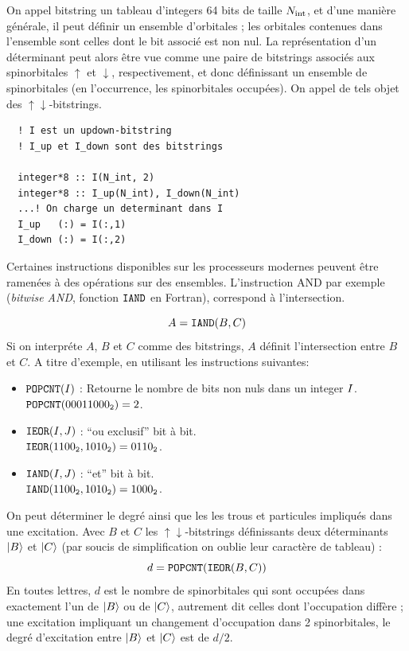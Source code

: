 \documentclass[./thesis.tex]{subfiles}
\begin{document}
On appel bitstring un tableau d'integers 64 bits de taille ${N_\text{int}}$, et d'une manière générale, il peut définir un ensemble d'orbitales ; les orbitales contenues dans l'ensemble sont celles dont le bit associé est non nul. La représentation d'un déterminant peut alors être vue comme une paire de bitstrings associés aux spinorbitales $\uparrow$ et $\downarrow$, respectivement, et donc définissant un ensemble de spinorbitales (en l’occurrence, les spinorbitales occupées). On appel de tels objet des $\uparrow\downarrow$-bitstrings.
\lstset{frame=single}
\begin{lstlisting}
  ! I est un updown-bitstring
  ! I_up et I_down sont des bitstrings
  
  integer*8 :: I(N_int, 2)
  integer*8 :: I_up(N_int), I_down(N_int)
  ...! On charge un determinant dans I
  I_up   (:) = I(:,1)
  I_down (:) = I(:,2)
\end{lstlisting}
\lstset{frame=none}

Certaines instructions disponibles sur les processeurs modernes peuvent être ramenées à des opérations sur des ensembles. L'instruction AND par exemple (\emph{bitwise AND}, fonction $\text{\texttt{IAND}}$ en Fortran), correspond à l'intersection.

\begin{equation}
A = \text{\texttt{IAND}}(B,C)
\end{equation}
Si on interpréte $A$, $B$ et $C$ comme des bitstrings, $A$ définit l'intersection entre $B$ et $C$.
A titre d'exemple, en utilisant les instructions suivantes:
\begin{sloppypar}
\begin{itemize} 
        \item $\text{\texttt{POPCNT}}({{{I}}})$ :
        Retourne le nombre de bits non nuls dans un integer ${{{I}}}$. \\
        ${\text{\texttt{POPCNT}}({00011000_{\mathtt{2}}}) = 2}$.
         
        \item $\text{\texttt{IEOR}}({{{I}}},{{{J}}})$ : ``ou exclusif'' bit à bit. \\
        ${\text{\texttt{IEOR}}({1100_{\mathtt{2}}},{1010_{\mathtt{2}}}) = {0110_{\mathtt{2}}}}$.
              
              
        \item $\text{\texttt{IAND}}({{{I}}},{{{J}}})$ : ``et'' bit à bit. \\
        ${\text{\texttt{IAND}}({1100_{\mathtt{2}}},{1010_{\mathtt{2}}}) = {1000_{\mathtt{2}}}}$.
\end{itemize}
\end{sloppypar}
On peut déterminer le degré ainsi que les les trous et particules impliqués dans une excitation.
Avec $B$ et $C$ les $\uparrow \downarrow$-bitstrings définissants deux déterminants $\ket B$ et $\ket C$ (par soucis de simplification on oublie leur caractère de tableau) :
\begin{equation}
d = \text{\texttt{POPCNT}}(\text{\texttt{IEOR}}(B,C))
\end{equation}
En toutes lettres, $d$ est le nombre de spinorbitales qui sont occupées dans exactement l'un de $\ket B$ ou de $\ket C$, autrement dit celles dont l'occupation diffère  ; une excitation impliquant un changement d'occupation dans 2 spinorbitales, le degré d'excitation entre $\ket B$ et $\ket C$ est de $d/2$.
\end{document}
